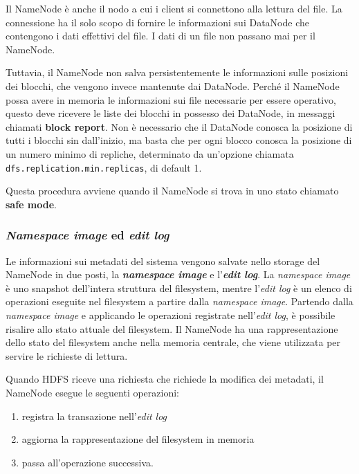 \documentclass[italian,a4paper, twoside, 12pt]{report}
\providecommand{\tightlist}{%
  \setlength{\itemsep}{0pt}\setlength{\parskip}{0pt}}
\begin{document}
Il NameNode è anche il nodo a cui i client si connettono alla lettura
del file. La connessione ha il solo scopo di fornire le informazioni sui
DataNode che contengono i dati effettivi del file. I dati di un file non
passano mai per il NameNode.

Tuttavia, il NameNode non salva persistentemente le informazioni sulle
posizioni dei blocchi, che vengono invece mantenute dai DataNode. Perché
il NameNode possa avere in memoria le informazioni sui file necessarie
per essere operativo, questo deve ricevere le liste dei blocchi in
possesso dei DataNode, in messaggi chiamati \textbf{block report}. Non è
necessario che il DataNode conosca la posizione di tutti i blocchi sin
dall'inizio, ma basta che per ogni blocco conosca la posizione di un
numero minimo di repliche, determinato da un'opzione chiamata
\texttt{dfs.replication.min.replicas}, di default 1.

Questa procedura avviene quando il NameNode si trova in uno stato
chiamato \textbf{safe mode}.

\subsubsection{\texorpdfstring{\emph{Namespace image} ed \emph{edit
log}}{Namespace image ed edit log}}\label{namespace-image-ed-edit-log}

Le informazioni sui metadati del sistema vengono salvate nello storage
del NameNode in due posti, la \emph{\textbf{namespace image}} e
l'\emph{\textbf{edit log}}. La \emph{namespace image} è uno snapshot
dell'intera struttura del filesystem, mentre l'\emph{edit log} è un
elenco di operazioni eseguite nel filesystem a partire dalla
\emph{namespace image}. Partendo dalla \emph{namespace image} e
applicando le operazioni registrate nell'\emph{edit log}, è possibile
risalire allo stato attuale del filesystem. Il NameNode ha una
rappresentazione dello stato del filesystem anche nella memoria
centrale, che viene utilizzata per servire le richieste di lettura.

Quando HDFS riceve una richiesta che richiede la modifica dei metadati,
il NameNode esegue le seguenti operazioni:

\begin{enumerate}
\tightlist
\item
  registra la transazione nell'\emph{edit log}
\item
  aggiorna la rappresentazione del filesystem in memoria
\item
  passa all'operazione successiva.
\end{enumerate}
\end{document}
